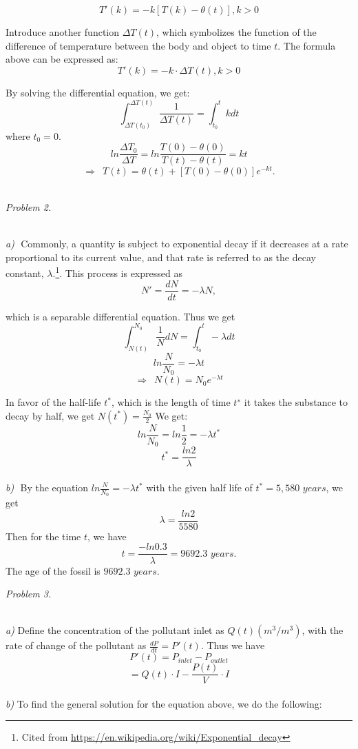 \documentclass{article}
\begin{document}
$$T'(k)=-k[T(k)-\theta(t)] , k>0$$
\par Introduce another function $\Delta  T(t)$, which symbolizes the function of the difference of temperature between the body and object to time $t$. The formula above can be expressed as:
$$T'(k)=-k\cdot\Delta T(t) , k>0$$
\par By solving the differential equation, we get:
$$\int_{\Delta T(t_0)}^{\Delta T(t)}\frac{1}{\Delta T(t)}=\int_{t_0}^{t}kdt$$
where $t_0=0$.
$$ln\frac{\Delta T_0}{\Delta T}=ln\frac{T(0)-\theta(0)}{T(t)-\theta(t)}=kt$$
$$\Rightarrow\,\,\,T(t)=\theta(t)+[T(0)-\theta(0)]e^{-kt}.$$
~\\
%
%
\par
\begin{Large}
\textit{Problem 2.}
\end{Large}
\vspace{0.5em}
\\
\textit{a)}\,\, Commonly, a quantity is subject to exponential decay if it decreases at a rate proportional to its current value, and that rate is referred to as the decay constant, $\lambda$.\footnote{ Cited from \url{ https://en.wikipedia.org/wiki/Exponential_decay}}. This process is expressed as 
$$N'=\frac{dN}{dt}=-\lambda N,$$
\par which is a separable differential equation. Thus we get
$$\int_{N(t)}^{N_0}\frac{1}{N}dN=\int_{t_0}^t-\lambda dt$$
$$ln\frac{N}{N_0}=-\lambda t$$
$$\Rightarrow\,\,\, N(t)=N_0e^{-\lambda t}$$
\par In favor of the half-life $t^*$, which is the length of time $t^∗$ it takes the substance to decay by half, we get $N(t^*)=\frac{N_0}{2}$
We get:
$$ln\frac{N}{N_0}=ln\frac{1}{2}=-\lambda t^*$$
$$t^*=\frac{ln2}{\lambda}$$
~\\
\textit{b)}\,\, By the equation $ln\frac{N}{N_0}=-\lambda t^*$ with the given half	 life of $t^*=5,580\,\,years$, we get
$$\lambda=\frac{ln2}{5580}$$
Then for the time $t$, we have
$$t=\frac{-ln0.3}{\lambda}=9692.3\,\,years.$$
The age of the fossil is $9692.3\,\,years.$
~\\
\par
\vspace{2em}
\begin{Large}
\textit{Problem 3.}
\end{Large}
\vspace{0.5em}
\\
\textit{a)}\,\,Define the concentration of the pollutant inlet as $Q(t)(m^3/m^3)$, with the rate of change of the pollutant as $\frac{dP}{dt}=P'(t)$. Thus we have
$$P'(t)=P_{inlet}-P_{outlet}$$
$$=Q(t)\cdot I-\frac{P(t)}{V}\cdot I$$
\\
\textit{b)}\,\,To find the general solution for the equation above, we do the following:
\end{document}
